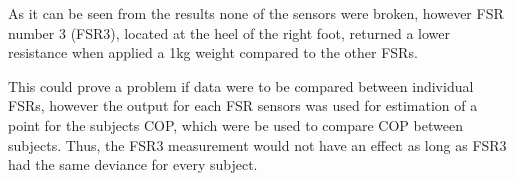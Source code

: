 As it can be seen from the results none of the sensors were broken, however FSR number 3 (FSR3), located at the heel of the right foot, returned a lower resistance when applied a 1kg weight compared to the other FSRs. 



This could prove a problem if data were to be compared between individual FSRs, however the output for each FSR sensors was used for estimation of a point for the subjects COP, which were be used to compare COP between subjects. Thus, the FSR3 measurement would not have an effect as long as FSR3 had the same deviance for every subject. 



